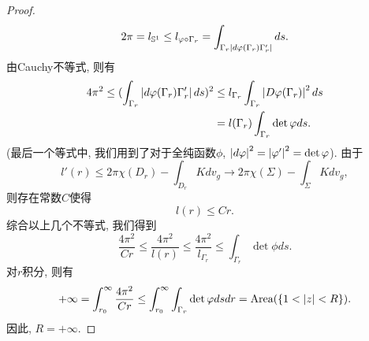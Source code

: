 \begin{proof}
    \begin{equation}
        2\pi = l_{\mathbb{S}^1} \le l_{\varphi\circ \Gamma_r} = \int_{\Gamma_r \left | d \varphi(\Gamma_r)\Gamma'_r \right |}ds.
    \end{equation}
    由Cauchy不等式, 则有
    \begin{equation}
        \begin{split}
            4\pi^2 \le (\int_{\Gamma_r} \left | d\varphi(\Gamma_r)\Gamma'_r \right |ds)^2 & \le l_{\Gamma_r}\int_{\Gamma_r}\left | D\varphi(\Gamma_r) \right |^2ds \\
            & =l(\Gamma_r)\int_{\Gamma_r}\det \varphi ds.
        \end{split}
    \end{equation}
    (最后一个等式中, 我们用到了对于全纯函数$\phi$, $\left | d\varphi \right |^2 = \left | \varphi' \right |^2= \det \varphi$). 由于
    \begin{equation}
        l'(r) \le 2\pi\chi(D_r) - \int_{D_r}Kdv_g \to 2\pi\chi(\Sigma) - \int_\Sigma K dv_g,
    \end{equation}
    则存在常数$C$使得 
    \begin{equation}
        l(r) \le Cr.
    \end{equation}
    综合以上几个不等式, 我们得到
    \begin{equation}
        \frac{4\pi^2}{Cr} \le \frac{4\pi^2}{l(r)} \le \frac{4\pi^2}{l_{\Gamma_r}} \le \int_{\Gamma_r}\det\phi ds.
    \end{equation}
    对$r$积分, 则有
    \begin{equation}
        +\infty = \int^\infty_{r_0} \frac{4\pi^2}{Cr} \le \int^\infty_{r_0}\int_{\Gamma_r} \det\varphi dsdr = \text{Area}(\{1<\left | z \right |< R\}).
    \end{equation}
    因此, $R=+\infty$.
\end{proof}